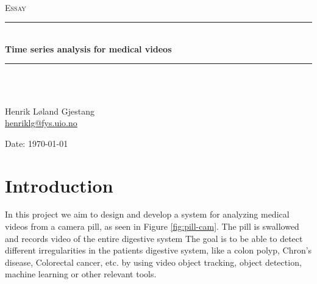 \documentclass[english, a4paper]{article}
\begin{document}
\begin{titlepage}
  \begin{center}

  \textsc{}\\[1.0cm]
  \textsc{\Large Essay}\\[0.5cm]
  \rule{\linewidth}{0.5mm} \\[0.4cm]
  {\huge \bfseries Time series analysis for medical videos}\\[0.10cm]
  \rule{\linewidth}{0.5mm} \\[1.5cm]
  \textsc{}\\[7.0cm]

  \begin{minipage}{0.69\textwidth}
    \begin{center} \large
      Henrik Løland Gjestang\\ \url{henriklg@fys.uio.no} \\[0.8cm]
    \end{center}
  \end{minipage}
  \vfill

  \large{Date: \today}
  \end{center}
\end{titlepage}


\tableofcontents
\newpage




\section{Introduction}

In this project we aim to design and develop a system for analyzing medical videos from a camera pill, as seen in Figure \ref{fig:pill-cam}. The pill is swallowed and records video of the entire digestive system The goal is to be able to detect different irregularities in the patients digestive system, like a colon polyp, Chron's disease, Colorectal cancer, etc. by using video object tracking, object detection, machine learning or other relevant tools.
\end{document}
